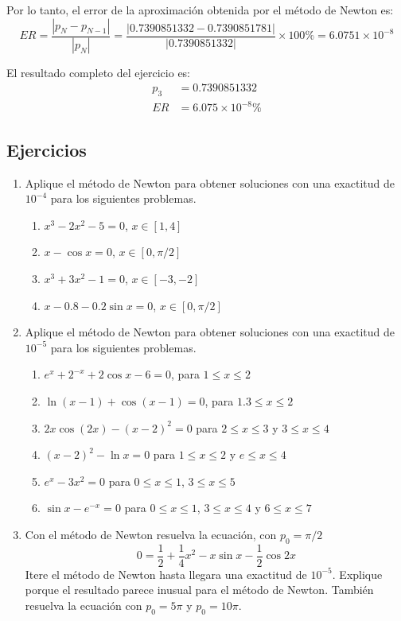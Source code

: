 \begin{exerciseT}
Por lo tanto, el error de la aproximación obtenida por el método de Newton es:
\[ER = \frac{|p_{N} - p_{N-1}|}{|p_{N}|} = \frac{|0.7390851332 - 0.7390851781|}{|0.7390851332|}\times 100\% = 6.0751\times 10^{-8}\]

El resultado completo del ejercicio es:
\begin{align*}
	p_3 &= 0.7390851332 \\
	ER &= 6.075\times 10^{-8} \%
\end{align*}

\label{ex:ejemplo1Newton}
\end{exerciseT}

\subsection*{Ejercicios}
\begin{enumerate}
	\item Aplique el método de Newton para obtener soluciones con una exactitud de $10^{-4}$ para los siguientes problemas.
		\begin{enumerate}
			\item $x^{3} - 2x^{2} -5 = 0$, $x\in [1,4]$
			\item $x - \cos x = 0$, $x\in [0, \pi/2]$
			\item $x^{3} + 3x^{2} - 1 = 0$, $x\in [-3, -2]$
			\item $x - 0.8 - 0.2\sin x = 0$, $x\in [0, \pi/2]$
		\end{enumerate}
		
		\item Aplique el método de Newton para obtener soluciones con una exactitud de $10^{-5}$ para los siguientes problemas. 
			\begin{enumerate}
				\item $e^{x} + 2^{-x} + 2\cos x - 6 = 0$, para $1\leq x\leq 2$
				\item $\ln (x-1) + \cos (x-1) = 0$, para $1.3\leq x\leq 2$
				\item $2x\cos (2x) - (x-2)^2 = 0$ para $2\leq x\leq 3$ y $3\leq x\leq 4$
				\item $(x-2)^2 - \ln x = 0$ para $1\leq x\leq 2$ y $e\leq x\leq 4$
				\item $e^{x} - 3x^2 = 0$ para $0\leq x\leq 1$, $3\leq x\leq 5$
				\item $\sin x - e^{-x} = 0$ para $0\leq x\leq 1$, $3\leq x\leq 4$ y $6\leq x\leq 7$
			\end{enumerate}		
			
		\item Con el método de Newton resuelva la ecuación, con $p_0 = \pi/2$
			$$0 = \frac{1}{2} + \frac{1}{4}x^2 - x\sin x - \frac{1}{2}\cos 2x$$	 
			Itere el método de Newton hasta llegara  una exactitud de $10^{-5}$. Explique porque el resultado parece inusual 
			para el método de Newton. También resuelva la ecuación con $p_0 = 5\pi$ y $p_0 = 10\pi$. 
\end{enumerate}

